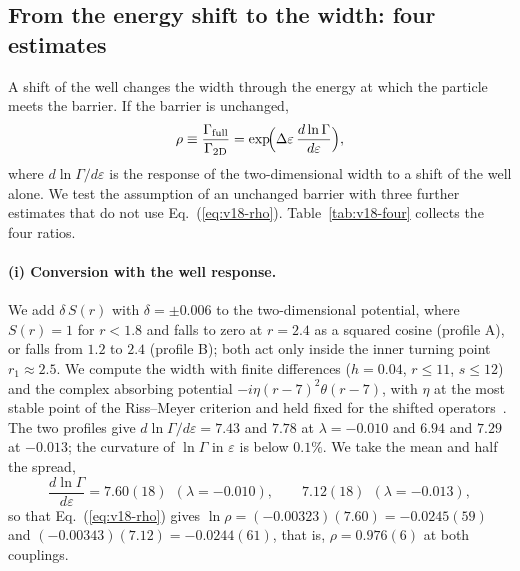 \subsection{From the energy shift to the width: four estimates}\label{sec:v18-gamma}

A shift of the well changes the width through the energy at which the particle meets the barrier.
If the barrier is unchanged,
\begin{equation}
\rho\equiv\frac{\Gamma_{\rm full}}{\Gamma_{\rm 2D}}=\exp\!\Bigl(\Delta\varepsilon\,\frac{d\ln\Gamma}{d\varepsilon}\Bigr),
\label{eq:v18-rho}
\end{equation}
where $d\ln\Gamma/d\varepsilon$ is the response of the two-dimensional width to a shift of the well alone.
We test the assumption of an unchanged barrier with three further estimates that do not use Eq.~(\ref{eq:v18-rho}).
Table~\ref{tab:v18-four} collects the four ratios.

\paragraph{(i) Conversion with the well response.}
We add $\delta\,S(r)$ with $\delta=\pm0.006$ to the two-dimensional potential, where $S(r)=1$ for $r<1.8$ and falls to zero at $r=2.4$ as a squared cosine (profile A), or falls from $1.2$ to $2.4$ (profile B); both act only inside the inner turning point $r_1\approx2.5$. %
We compute the width with finite differences ($h=0.04$, $r\le11$, $s\le12$) and the complex absorbing potential $-i\eta(r-7)^2\theta(r-7)$, with $\eta$ at the most stable point of the Riss--Meyer criterion and held fixed for the shifted operators~\cite{Riss:1993cap}.
The two profiles give $d\ln\Gamma/d\varepsilon=7.43$ and $7.78$ at $\lambda=-0.010$ and $6.94$ and $7.29$ at $-0.013$; the curvature of $\ln\Gamma$ in $\varepsilon$ is below $0.1\%$. %
We take the mean and half the spread,
\begin{equation}
\frac{d\ln\Gamma}{d\varepsilon}=7.60(18)\ \ (\lambda=-0.010),\qquad 7.12(18)\ \ (\lambda=-0.013),
\label{eq:v18-dlng}
\end{equation}
so that Eq.~(\ref{eq:v18-rho}) gives $\ln\rho=(-0.00323)(7.60)=-0.0245(59)$ and $(-0.00343)(7.12)=-0.0244(61)$, that is, $\rho=0.976(6)$ at both couplings. %

